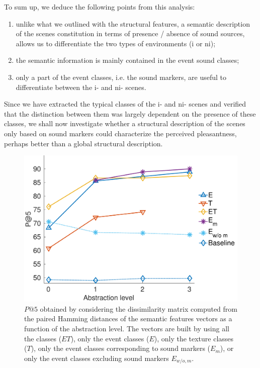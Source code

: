 \documentclass[twoside,twocolumn]{article}
\begin{document}
To sum up, we deduce the following points from this analysis:

\begin{enumerate}
\item unlike what we outlined with the structural features, a semantic description of the scenes constitution in terms of presence / absence of sound sources, allows us to differentiate the two types of environments (i or ni);
\item the semantic information is mainly contained in the event sound classes;
\item only a part of the event classes, i.e. the sound markers, are useful to differentiate between the i- and ni- scenes.
\end{enumerate}

Since we have extracted the typical classes of the i- and ni- scenes and verified that the distinction between them was largely dependent on the presence of these classes, we shall now investigate whether a structural description of the scenes only based on sound markers could characterize the perceived pleasantness, perhaps better than a global structural description.

\begin{figure}[t]
        \myfloatalign
        \includegraphics[width=\linewidth]{gfx/ch_5/pa5_1_en}
       \caption{$P@5$ obtained by considering the dissimilarity matrix computed from the paired Hamming distances of the semantic features vectors as a function of the abstraction level. The vectors are built by using all the classes ($ET$), only the event classes ($E$), only the texture classes ($T$), only the event classes corresponding to sound markers ($E_m$), or only the event classes excluding sound markers $E_{w/o,m}$.}\label{fig:pa5}
\end{figure}
\end{document}
